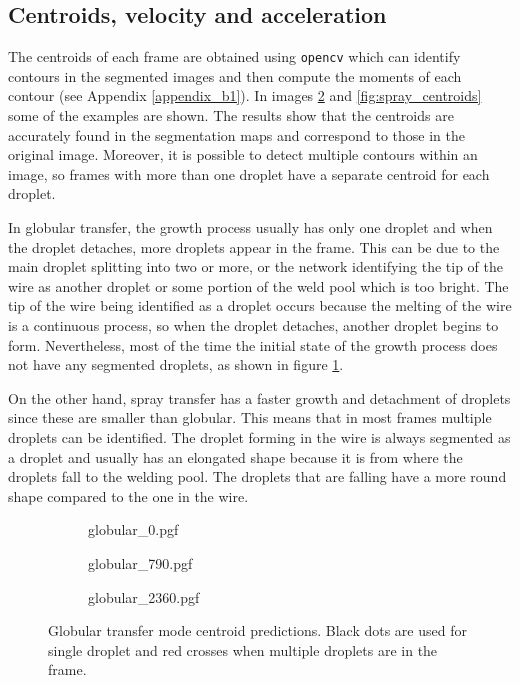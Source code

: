 \subsection{Centroids, velocity and acceleration}

The centroids of each frame are obtained using \texttt{opencv} which can identify contours in the segmented images and then compute the moments of each contour (see Appendix \ref{appendix_b1}). In images \ref{fig:globular_centroids} and \ref{fig:spray_centroids} some of the examples are shown. The results show that the centroids are accurately found in the segmentation maps and correspond to those in the original image. Moreover, it is possible to detect multiple contours within an image, so frames with more than one droplet have a separate centroid for each droplet.

In globular transfer, the growth process usually has only one droplet and when the droplet detaches, more droplets appear in the frame. This can be due to the main droplet splitting into two or more, or the network identifying the tip of the wire as another droplet or some portion of the weld pool which is too bright. The tip of the wire being identified as a droplet occurs because the melting of the wire is a continuous process, so when the droplet detaches, another droplet begins to form. Nevertheless, most of the time the initial state of the growth process does not have any segmented droplets, as shown in figure \ref{fig:globular_centroids_3}.

On the other hand, spray transfer has a faster growth and detachment of droplets since these are smaller than globular. This means that in most frames multiple droplets can be identified. The droplet forming in the wire is always segmented as a droplet and usually has an elongated shape because it is from where the droplets fall to the welding pool. The droplets that are falling have a more round shape compared to the one in the wire.

\begin{figure}
\centering
  \begin{subfigure}[b]{.95\textwidth}
    {globular_0.pgf}
    \caption{}

  \end{subfigure}
\vfill
  \begin{subfigure}[b]{.95\textwidth}
    {globular_790.pgf}
    \caption{}
  \end{subfigure}
  \vfill
 \begin{subfigure}[b]{.95\textwidth}
    {globular_2360.pgf}
    \caption{}
    \label{fig:globular_centroids_3}
  \end{subfigure}
    \caption[Globular transfer mode centroid predictions]{Globular transfer mode centroid predictions. Black dots are used for single droplet and red crosses when multiple droplets are in the frame.}
    \label{fig:globular_centroids}
\end{figure}

